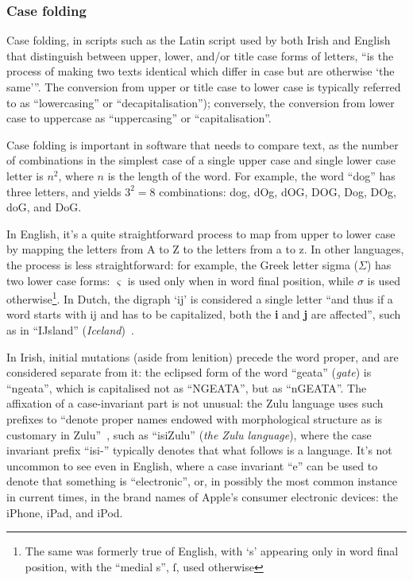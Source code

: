 \subsubsection{Case folding}
\label{ssect:casefold}

Case folding, in scripts such as the Latin script used by both Irish and English that distinguish 
between upper, lower, and/or title case forms of letters, ``is the process of making two texts identical 
which differ in case but are otherwise `the same'''\citep[s. 2.1]{Phillips:16:CMW}. The conversion from 
upper or title case to lower case is typically referred to as ``lowercasing'' or ``decapitalisation''); 
conversely, the conversion from lower case to uppercase as ``uppercasing'' or ``capitalisation''.

Case folding is important in software that needs to compare text, as the number of combinations in the 
simplest case of a single upper case and single lower case letter is $n^2$, where $n$ is the length of 
the word. For example, the  word ``dog'' has three letters, and yields $3^2 = 8$ combinations: dog, dOg, 
dOG, DOG, Dog, DOg, doG, and DoG.

In English, it's a quite straightforward process to map from upper to lower case by mapping the letters 
from A to Z to the letters from a to z. In other languages, the process is less straightforward: for 
example, the Greek letter sigma ($\Sigma$) has two lower case forms: $\varsigma$ is used only when in 
word final position, while $\sigma$ is used otherwise\footnote{The same was formerly true of English, 
with `s' appearing only in word final position, with the ``medial s'', ſ, used otherwise}. In Dutch, the 
digraph `ij' is considered a single letter ``and thus if a word starts with ij and has to be capitalized, 
both the \textbf{i} and \textbf{j} are affected'', such as in ``IJsland'' 
(\textit{Iceland})~\citep[p. 14]{donaldson2008dutch}.

In Irish, initial mutations (aside from lenition) precede the word proper, and are considered separate
from it: the eclipsed form of the word ``geata'' (\textit{gate}) is ``ngeata'', which is capitalised not
as ``NGEATA'', but as ``nGEATA''. The affixation of a case-invariant part is not unusual: the Zulu 
language uses such prefixes to ``denote proper names endowed with morphological structure as is customary 
in Zulu''~\citep[p. 143]{bosch2011towards}, such as ``isiZulu'' (\textit{the Zulu language}), where the 
case invariant prefix ``isi-'' typically denotes that what follows is a language. It's not uncommon to
see even in English, where a case invariant ``e'' can be used to denote that something is ``electronic'',
or, in possibly the most common instance in current times, in the brand names of Apple's consumer
electronic devices: the iPhone, iPad, and iPod.

